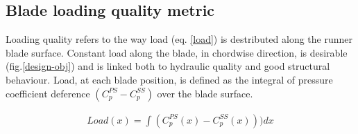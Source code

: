 


\subsection{Blade loading quality metric}
Loading quality refers to the way load (eq. \ref{load}) is destributed along the runner blade surface. Constant load along the blade, in chordwise direction, is desirable (fig.\ref{design-obj}) and is linked both to hydraulic quality and good structural behaviour. Load, at each blade position, is defined as the integral of pressure coefficient deference $(C_p^{PS}-C_p^{SS})$ over the blade surface. 

\begin{align} 
   Load(x)=\int (C_p^{PS}(x)-C_p^{SS}(x))) dx 
\label{load}
\end{align}

  

